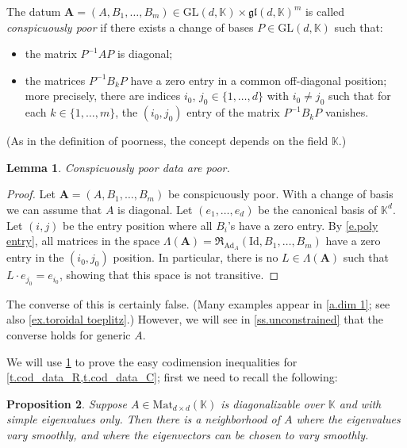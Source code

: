 \documentclass[10pt, a4paper]{amsart}
\theoremstyle{plain}
\newtheorem{lemma}{Lemma}[section]
\newtheorem{prop}[lemma]{Proposition}
\theoremstyle{definition}
\theoremstyle{remark}
\theoremstyle{note}
\numberwithin{equation}{section}
\begin{document}
\medskip

The datum ${\mathbf{A}} = (A, B_1, \dots, B_m) \in {\mathrm{GL}}(d,{\mathbb{K}}) \times {\mathfrak{gl}}(d,{\mathbb{K}})^m$
is called \emph{conspicuously poor}
if there exists a change of bases $P \in {\mathrm{GL}}(d,{\mathbb{K}})$ such that:
\begin{itemize}
\item 
the matrix $P^{-1} A P$ is diagonal;
\item 
the matrices $P^{-1} B_k P$ have a zero entry in a common off-diagonal position;
more precisely, 
there are indices $i_0$, $j_0 \in \{1,\dots,d\}$ with $i_0 \neq j_0$ 
such that for each $k \in \{1,\dots,m\}$, the $(i_0,j_0)$ entry of the matrix $P^{-1} B_k P$ vanishes.
\end{itemize}
(As in the definition of poorness, the concept depends on the field ${\mathbb{K}}$.)

\begin{lemma}\label{l.easy_poor_data}
Conspicuously poor data are poor.
\end{lemma}

\begin{proof}
Let ${\mathbf{A}} = (A, B_1, \dots, B_m)$ be conspicuously poor.
With a change of basis we can assume that $A$ is diagonal.
Let $(e_1,\dots,e_d)$ be the canonical basis of ${\mathbb{K}}^d$.
Let $(i,j)$ be the entry position where all $B_i$'s have a zero entry. 
By \eqref{e.poly entry}, all matrices in the space 
$\Lambda({\mathbf{A}}) = {\mathfrak{R}}_{{\mathrm{Ad}}_A}({\mathrm{Id}}, B_1, \dots, B_m)$ have a zero entry in the $(i_0,j_0)$ position.
In particular, there is no $L \in \Lambda({\mathbf{A}})$ such that $L \cdot e_{j_0} = e_{i_0}$,
showing that this space is not transitive.
\end{proof}

The converse of this  is certainly false.
(Many examples appear in \cref{a.dim 1}; see also \cref{ex.toroidal toeplitz}.)
However, we will see in \cref{ss.unconstrained} that the converse holds for generic $A$.

\medskip

We will use \cref{l.easy_poor_data} to prove the easy codimension inequalities for \cref{t.cod_data_R,t.cod_data_C};
first we need to recall the following:

\begin{prop}\label{p.eigen_smooth}
Suppose $A \in {\mathrm{Mat}}_{d\times d}({\mathbb{K}})$ is diagonalizable over ${\mathbb{K}}$ and with simple eigenvalues only.	
Then there is a neighborhood of $A$ where the eigenvalues vary smoothly, 
and where the eigenvectors can be chosen to vary smoothly.
\end{prop}
\end{document}
